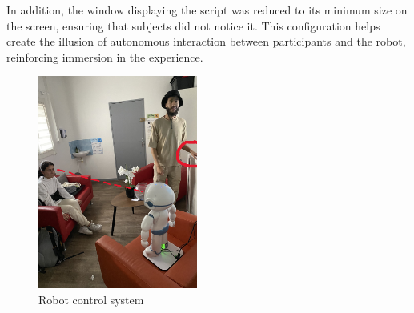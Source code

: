In addition, the window displaying the script was reduced to its minimum size on the screen, ensuring that subjects did not notice it. This configuration helps create the illusion of autonomous interaction between participants and the robot, reinforcing immersion in the experience.
\begin{figure}[!h]
\centering
\includegraphics[height=7cm]{Figures/magicien3.jpg}
\caption{Robot control system}
\end{figure}\\

